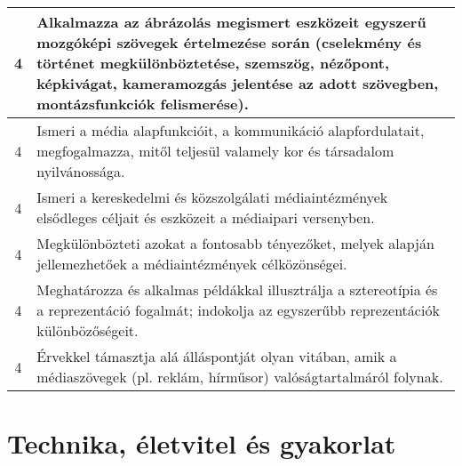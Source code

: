 \begin{longtable}{c | p{} }
                                
                                          4 &  Alkalmazza az ábrázolás megismert eszközeit egyszerű mozgóképi szövegek értelmezése során (cselekmény és történet megkülönböztetése, szemszög, nézőpont, képkivágat, kameramozgás jelentése az adott szövegben, montázsfunkciók felismerése). \\ \hline
                                          4 &  Ismeri a média alapfunkcióit, a kommunikáció alapfordulatait, megfogalmazza, mitől teljesül valamely kor és társadalom nyilvánossága. \\ \hline
                                          4 &  Ismeri a kereskedelmi és közszolgálati médiaintézmények elsődleges céljait és eszközeit a médiaipari versenyben. \\ \hline
                                          4 &  Megkülönbözteti azokat a fontosabb tényezőket, melyek alapján jellemezhetőek a médiaintézmények célközönségei. \\ \hline
                                          4 &  Meghatározza és alkalmas példákkal illusztrálja a sztereotípia és a reprezentáció fogalmát; indokolja az egyszerűbb reprezentációk különbözőségeit. \\ \hline
                                          4 &  Érvekkel támasztja alá álláspontját olyan vitában, amik a médiaszövegek (pl. reklám, hírműsor) valóságtartalmáról folynak. \\ \hline
                                      
                        \end{longtable}
            \clearpage

        \section{Technika, életvitel és gyakorlat}

